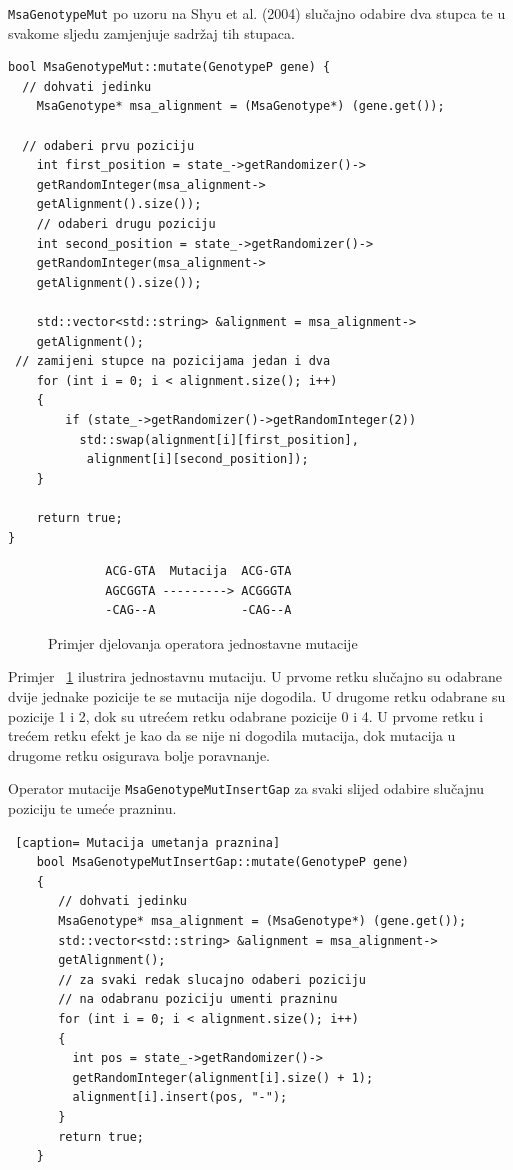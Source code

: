 \documentclass[times, utf8, zavrsni, numeric]{fer}
\begin{document}
 \texttt{MsaGenotypeMut} po uzoru na Shyu et al. (2004) slučajno odabire dva stupca te u svakome sljedu zamjenjuje sadržaj tih stupaca.
 \begin{lstlisting}[caption=Jednostavna mutacija izmjene stupaca]
 bool MsaGenotypeMut::mutate(GenotypeP gene) {
  // dohvati jedinku
 	MsaGenotype* msa_alignment = (MsaGenotype*) (gene.get());
 
  // odaberi prvu poziciju
 	int first_position = state_->getRandomizer()->
 	getRandomInteger(msa_alignment->
 	getAlignment().size());
 	// odaberi drugu poziciju
 	int second_position = state_->getRandomizer()->
 	getRandomInteger(msa_alignment->
 	getAlignment().size());
  		
  	std::vector<std::string> &alignment = msa_alignment->
  	getAlignment();
 // zamijeni stupce na pozicijama jedan i dva 
 	for (int i = 0; i < alignment.size(); i++)
 	{
 		if (state_->getRandomizer()->getRandomInteger(2))
 		  std::swap(alignment[i][first_position],
 		   alignment[i][second_position]);
 	}
 
 	return true;
}
 \end{lstlisting}
 
 \begin{figure} [httb]
	\begin{verbatim}
		ACG-GTA  Mutacija  ACG-GTA
		AGCGGTA ---------> ACGGGTA
		-CAG--A            -CAG--A
	\end{verbatim}
	\caption{Primjer djelovanja operatora jednostavne mutacije}
	\label{fig:jednostavnaMutacija}
 \end{figure}

Primjer ~\ref{fig:jednostavnaMutacija} ilustrira jednostavnu mutaciju. U prvome retku slučajno su odabrane dvije jednake pozicije te se mutacija nije dogodila. U drugome retku odabrane su pozicije 1 i 2, dok su utrećem retku odabrane pozicije 0 i 4. U prvome retku i trećem retku efekt je kao da se nije ni dogodila mutacija, dok mutacija u drugome retku osigurava bolje poravnanje.

 Operator mutacije \texttt{MsaGenotypeMutInsertGap} za svaki slijed odabire slučajnu poziciju te umeće prazninu.
 \begin{lstlisting} [caption= Mutacija umetanja praznina]
 	bool MsaGenotypeMutInsertGap::mutate(GenotypeP gene)
 	{
 	   // dohvati jedinku
 	   MsaGenotype* msa_alignment = (MsaGenotype*) (gene.get());
 	   std::vector<std::string> &alignment = msa_alignment->
 	   getAlignment();
 	   // za svaki redak slucajno odaberi poziciju 
 	   // na odabranu poziciju umenti prazninu
 	   for (int i = 0; i < alignment.size(); i++)
 	   {
 	     int pos = state_->getRandomizer()->
 	     getRandomInteger(alignment[i].size() + 1);
 	     alignment[i].insert(pos, "-");
 	   }
 	   return true;
 	}

 \end{lstlisting}
 
\end{document}
